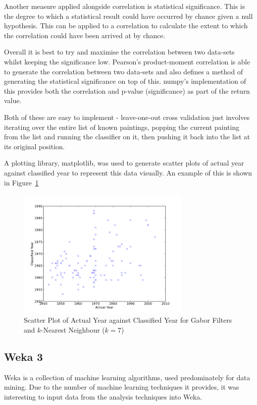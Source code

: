 Another measure applied alongside correlation is statistical significance. This is the degree to
which a statistical result could have occurred by chance given a null hypothesis. This can be applied
to a correlation to calculate the extent to which the correlation could have been arrived at by 
chance.

Overall it is best to try and maximise the correlation between two data-sets whilst keeping the
significance low. Pearson's product-moment correlation is able to generate the correlation between
two data-sets and also defines a method of generating the statistical significance on top of this.
numpy's implementation of this provides both the correlation and p-value (significance) as part of
the return value.

Both of these are easy to implement - leave-one-out cross validation just involves iterating over
the entire list of known paintings, popping the current painting from the list and running the 
classifier on it, then pushing it back into the list at its original position.

A plotting library, matplotlib, was used to generate scatter plots of actual year against 
classified year to represent this data visually. An example of this is shown in Figure~\ref{fig:scatter}

\begin{figure}[h]
\centering
\includegraphics[width=0.75\textwidth]{img/scatter.png}
\caption{Scatter Plot of Actual Year against Classified Year for Gabor Filters and $k$-Nearest 
Neighbour ($k=7$)}\label{fig:scatter}
\end{figure}

\subsection{Weka 3}
Weka is a collection of machine learning algorithms\cite{Hall2009WEKA}, used predominately for
data mining. Due to the number of machine learning techniques it provides, it was interesting to
input data from the analysis techniques into Weka.


